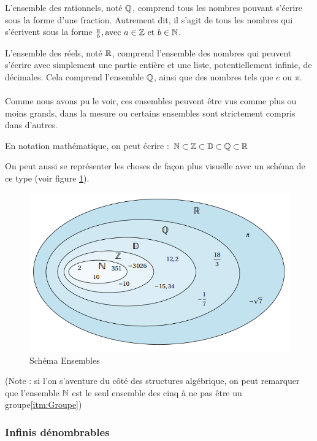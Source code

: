 L'ensemble des rationnels, noté $\mathbb{Q}$, comprend tous les nombres pouvant s'écrire sous la forme d'une fraction. Autrement dit, il s'agit de tous les nombres qui s'écrivent sous la forme $\frac{a}{b}, \text{avec} \ a \in \ens{Z} \ \text{et} \ b \in \ens{N}$.

L'ensemble des réels, noté $\mathbb{R}$, comprend l'ensemble des nombres qui peuvent s'écrire avec simplement une partie entière et une liste, potentiellement infinie, de décimales. Cela comprend l'ensemble $\mathbb{Q}$, ainsi que des nombres tels que $e$ ou $\pi$.\\
\\


Comme nous avons pu le voir, ces ensembles peuvent être vus comme plus ou moins grands, dans la mesure ou certains ensembles sont strictement compris dans d'autres.

En notation mathématique, on peut écrire : 
$\mathbb{N} \subset \mathbb{Z} \subset \mathbb{D} \subset \mathbb{Q} \subset \mathbb{R}$

On peut aussi se représenter les choses de façon plus visuelle avec un schéma de ce type (voir figure \ref{fig:schm_ensembles}).

\begin{figure}[h]
    \centering
    \includegraphics[scale=0.5]{schema_ensembles.png}
    \caption{Schéma Ensembles}
    \label{fig:schm_ensembles}
\end{figure}

(Note : si l'on s'aventure du côté des structures algébrique, on peut remarquer que l'ensemble $\mathbb{N}$ est le seul ensemble des cinq à ne pas être un groupe\ref{itm:Groupe})

\subsubsection{Infinis dénombrables}


